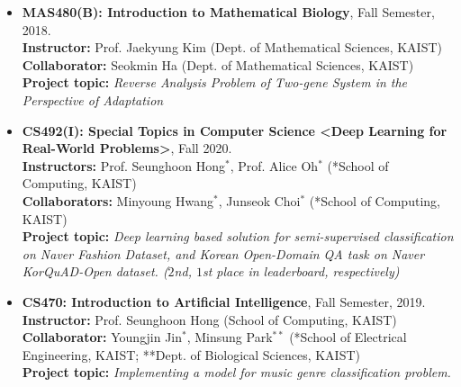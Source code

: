 \documentclass[10pt,a4]{article}
\begin{document}
\begin{small}
\begin{itemize}
	\item {\bf MAS480(B): Introduction to Mathematical Biology}, Fall Semester, 2018. \\
	{\bf Instructor:} Prof. Jaekyung Kim (Dept. of Mathematical Sciences, KAIST) \\
	{\bf Collaborator:} Seokmin Ha (Dept. of Mathematical Sciences, KAIST) \\
	{\bf Project topic:} {\it Reverse Analysis Problem of Two-gene System in the
		Perspective of Adaptation} \\
	
	\item {\bf CS492(I): Special Topics in Computer Science <Deep Learning for Real-World Problems>}, Fall 2020. \\
	{\bf Instructors:} Prof. Seunghoon Hong$^{*}$, Prof. Alice Oh$^{*}$ (*School of Computing, KAIST) \\
	{\bf Collaborators:} Minyoung Hwang$^{*}$, Junseok Choi$^{*}$ (*School of Computing, KAIST) \\
	{\bf Project topic:} {\it Deep learning based solution for semi-supervised classification on Naver Fashion Dataset, and Korean Open-Domain QA task on Naver KorQuAD-Open dataset. ($2$nd, $1$st place in leaderboard, respectively)} \\
	
	\item {\bf CS470: Introduction to Artificial Intelligence}, Fall Semester, 2019. \\
	{\bf Instructor:} Prof. Seunghoon Hong (School of Computing, KAIST) \\
	{\bf Collaborator:} Youngjin Jin$^{*}$, Minsung Park$^{**}$ (*School of Electrical Engineering, KAIST; **Dept. of Biological Sciences, KAIST) \\
	{\bf Project topic:} {\it Implementing a model for music genre classification problem.} \\
	

\end{itemize}
\end{small}
\end{document}
